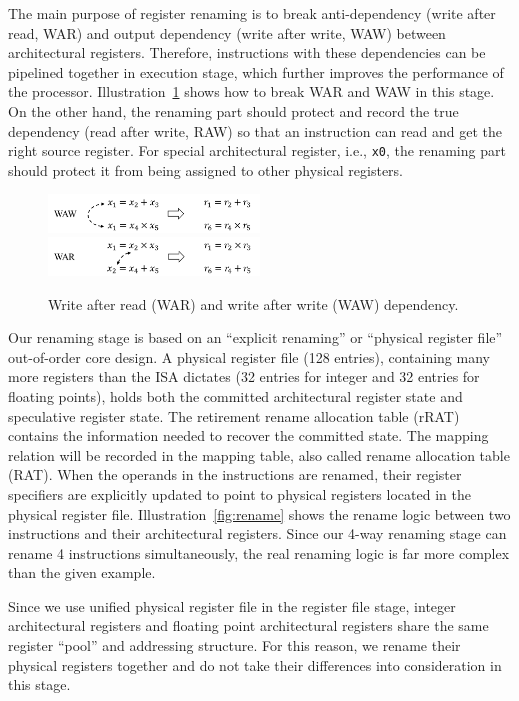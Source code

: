 The main purpose of register renaming is to break anti-dependency (write after read, WAR) and output dependency (write after write, WAW) between architectural registers. Therefore, instructions with these dependencies can be pipelined together in execution stage, which further improves the performance of the processor. Illustration~\ref{fig:waw_war} shows how to break WAR and WAW in this stage. On the other hand, the renaming part should protect and record the true dependency (read after write, RAW) so that an instruction can read and get the right source register. For special architectural register, i.e., \texttt{x0}, the renaming part should protect it from being assigned to other physical registers.

\begin{figure}[!htp]
    \centering
    \includegraphics[width=0.5\textwidth]{figure/waw.png}
    \includegraphics[width=0.5\textwidth]{figure/war.png}
    \caption{Write after read (WAR) and write after write (WAW) dependency.}
    \label{fig:waw_war}
\end{figure}

Our renaming stage is based on an ``explicit renaming'' or ``physical register file'' out-of-order core design. A physical register file (128 entries), containing many more registers than the ISA dictates (32 entries for integer and 32 entries for floating points), holds both the committed architectural register state and speculative register state. The retirement rename allocation table (rRAT) contains the information needed to recover the committed state. The mapping relation will be recorded in the mapping table, also called rename allocation table (RAT). When the operands in the instructions are renamed, their register specifiers are explicitly updated to point to physical registers located in the physical register file. Illustration~\ref{fig:rename} shows the rename logic between two instructions and their architectural registers. Since our 4-way renaming stage can rename 4 instructions simultaneously, the real renaming logic is far more complex than the given example.

Since we use unified physical register file in the register file stage, integer architectural registers and floating point architectural registers share the same register ``pool'' and addressing structure. For this reason, we rename their physical registers together and do not take their differences into consideration in this stage.

